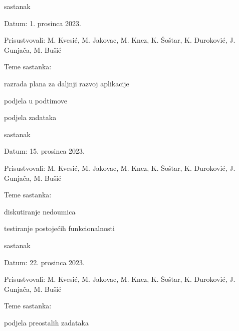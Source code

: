 \begin{packed_enum}
			\item  sastanak
			\item[] \begin{packed_item}
				\item Datum: 1. prosinca 2023.
				\item Prisustvovali: M. Kvesić, M. Jakovac, M. Knez, K. Šoštar, K. Đuroković, J. Gunjača, M. Bušić
				\item Teme sastanka:
				\begin{packed_item}
					\item  razrada plana za daljnji razvoj aplikacije
					\item  podjela u podtimove
					\item  podjela zadataka
				\end{packed_item}
			\end{packed_item}
			
			\item  sastanak
			\item[] \begin{packed_item}
				\item Datum: 15. prosinca 2023.
				\item Prisustvovali: M. Kvesić, M. Jakovac, M. Knez, K. Šoštar, K. Đuroković, J. Gunjača, M. Bušić
				\item Teme sastanka:
				\begin{packed_item}
					\item  diskutiranje nedoumica
					\item  testiranje postojećih funkcionalnosti
				\end{packed_item}
			\end{packed_item}
			
			\item  sastanak
			\item[] \begin{packed_item}
				\item Datum: 22. prosinca 2023.
				\item Prisustvovali: M. Kvesić, M. Jakovac, M. Knez, K. Šoštar, K. Đuroković, J. Gunjača, M. Bušić
				\item Teme sastanka:
				\begin{packed_item}
					\item  podjela preostalih zadataka
				\end{packed_item}
			\end{packed_item}
			

\end{packed_enum}
